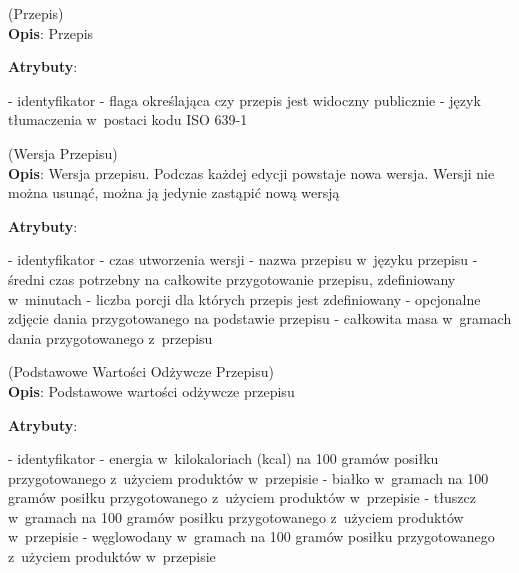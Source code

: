 \begin{enumerate}[label={\textbf{KAT/2/\protect\twodigits{\theenumi}}}, wide, labelwidth=!, labelindent=0pt, labelsep=0pt, series=reqs]
    \setlength\itemsep{1.75em}
    \label{kat:Recipe} (Przepis)\\
    \indent\textbf{Opis}: Przepis
    \par
    \textbf{Atrybuty}:
    \begin{itemize}[series=atr, wide, align=left, leftmargin=190pt]
        \label{kat:Recipe:id}- identyfikator
        \label{kat:Recipe:isPublic}- flaga określająca czy przepis jest widoczny publicznie
        \label{kat:Recipe:language}- język tłumaczenia w~postaci kodu ISO 639-1
    \end{itemize}

    \label{kat:RecipeVersion} (Wersja Przepisu)\\
    \indent\textbf{Opis}: Wersja przepisu. Podczas każdej edycji powstaje nowa wersja. Wersji nie można usunąć, można ją jedynie zastąpić nową wersją
    \par
    \textbf{Atrybuty}:
    \begin{itemize}[series=atr, wide, align=left, leftmargin=190pt]
        \label{kat:RecipeVersion:id}- identyfikator
        \label{kat:RecipeVersion:editTimestamp}- czas utworzenia wersji
        \label{kat:RecipeVersion:name}- nazwa przepisu w~języku przepisu
        \label{kat:RecipeVersion:preparationTimeMinutes}- średni czas potrzebny na całkowite przygotowanie przepisu, zdefiniowany w~minutach
        \label{kat:RecipeVersion:numberOfPortions}- liczba porcji dla których przepis jest zdefiniowany
        \label{kat:RecipeVersion:image}- opcjonalne zdjęcie dania przygotowanego na podstawie przepisu
        \label{kat:RecipeVersion:totalGramsWeight}- całkowita masa w~gramach dania przygotowanego z~przepisu
    \end{itemize}

    \label{kat:RecipeBasicNutritionData} (Podstawowe Wartości Odżywcze Przepisu)\\
    \indent\textbf{Opis}: Podstawowe wartości odżywcze przepisu
    \par
    \textbf{Atrybuty}:
    \begin{itemize}[series=atr, wide, align=left, leftmargin=190pt]
        \label{kat:RecipeBasicNutritionData:id}- identyfikator
        \label{kat:RecipeBasicNutritionData:energy}- energia w~kilokaloriach (kcal) na 100 gramów posiłku przygotowanego z~użyciem produktów w~przepisie
        \label{kat:RecipeBasicNutritionData:protein}- białko w~gramach na 100 gramów posiłku przygotowanego z~użyciem produktów w~przepisie
        \label{kat:RecipeBasicNutritionData:fat}- tłuszcz w~gramach na 100 gramów posiłku przygotowanego z~użyciem produktów w~przepisie
        \label{kat:RecipeBasicNutritionData:carbohydrates}- węglowodany w~gramach na 100 gramów posiłku przygotowanego z~użyciem produktów w~przepisie
    \end{itemize}


\end{enumerate}
